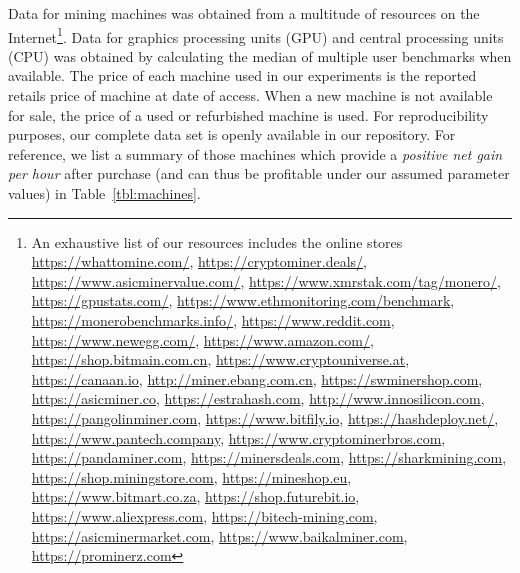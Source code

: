 Data for mining machines was obtained from a multitude of resources on the
Internet\footnote{An exhaustive list of our resources includes the online
stores \url{https://whattomine.com/}, \url{https://cryptominer.deals/},
\url{https://www.asicminervalue.com/},
\url{https://www.xmrstak.com/tag/monero/}, \url{https://gpustats.com/},
\url{https://www.ethmonitoring.com/benchmark},
\url{https://monerobenchmarks.info/}, \url{https://www.reddit.com},
\url{https://www.newegg.com/}, \url{https://www.amazon.com/},
\url{https://shop.bitmain.com.cn}, \url{https://www.cryptouniverse.at},
\url{https://canaan.io}, \url{http://miner.ebang.com.cn},
\url{https://swminershop.com}, \url{https://asicminer.co},
\url{https://estrahash.com}, \url{http://www.innosilicon.com},
\url{https://pangolinminer.com}, \url{https://www.bitfily.io},
\url{https://hashdeploy.net/}, \url{https://www.pantech.company},
\url{https://www.cryptominerbros.com}, \url{https://pandaminer.com},
\url{https://minersdeals.com}, \url{https://sharkmining.com},
\url{https://shop.miningstore.com}, \url{https://mineshop.eu},
\url{https://www.bitmart.co.za}, \url{https://shop.futurebit.io},
\url{https://www.aliexpress.com}, \url{https://bitech-mining.com},
\url{https://asicminermarket.com}, \url{https://www.baikalminer.com},
\url{https://prominerz.com}}. Data for graphics processing units (GPU) and
central processing units (CPU) was obtained by calculating the median of
multiple user benchmarks when available. The price of each machine used in our experiments is the
reported retails price of machine at date of access. When a new machine is not available
for sale, the price of a used or refurbished machine is used. For reproducibility
purposes, our complete data set is openly available in our repository. For
reference, we list a summary of those machines which provide a
\emph{positive net gain per hour} after purchase (and can thus be profitable
under our assumed parameter values) in Table~\ref{tbl:machines}.

